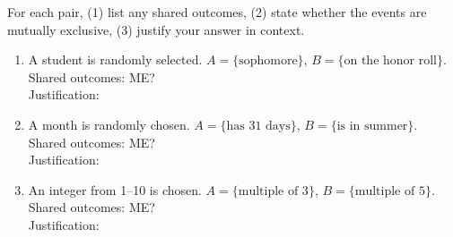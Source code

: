 \documentclass[10pt]{article}
\begin{document}
\vspace{0.1in}

\begin{practicebox}
\small For each pair, (1) list any shared outcomes, (2) state whether the events are
mutually exclusive, (3) justify your answer in context.

\vspace{6pt}
\begin{enumerate}[leftmargin=1.5em, itemsep=10pt]
  \item A student is randomly selected. $A = \{\text{sophomore}\}$, $B = \{\text{on the honor roll}\}$.\\
        Shared outcomes: \blank{4cm} \quad ME? \blank{2cm}\\
        Justification: \writeline

  \item A month is randomly chosen. $A = \{\text{has 31 days}\}$, $B = \{\text{is in summer}\}$.\\
        Shared outcomes: \blank{4cm} \quad ME? \blank{2cm}\\
        Justification: \writeline

  \item An integer from 1--10 is chosen. $A = \{\text{multiple of 3}\}$, $B = \{\text{multiple of 5}\}$.\\
        Shared outcomes: \blank{4cm} \quad ME? \blank{2cm}\\
        Justification: \writeline
\end{enumerate}
\end{practicebox}
\end{document}
